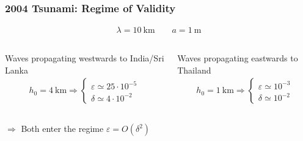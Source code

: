 \documentclass[fleqn]{beamer}
\begin{document}
    \begin{frame}
        \frametitle{2004 Tsunami: Regime of Validity}
        \begin{ceqn}
        \begin{align}
            \lambda = 10\ \text{km}\qquad a = 1\ \text{m}\nonumber
        \end{align}
        \end{ceqn}
        \begin{columns}
            Waves propagating westwards to India/Sri Lanka
            \begin{align}
            h_0 = 4\ \text{km} \Rightarrow
            \begin{cases}
                \varepsilon \simeq 25 \cdot 10^{-5}\\
                \delta \simeq 4\cdot 10^{-2}
            \end{cases}\nonumber
            \end{align}

            Waves propagating eastwards to Thailand
            \begin{align}
            h_0 = 1\ \text{km} \Rightarrow
            \begin{cases}
                \varepsilon \simeq 10^{-3}\\
                \delta \simeq 10^{-2}
            \end{cases}\nonumber
            \end{align}
        \end{columns}
        \vspace{0.5cm}
        \centering
        $\Rightarrow$ Both enter the regime $\varepsilon = O(\delta^2)$
    \end{frame}
\end{document}
